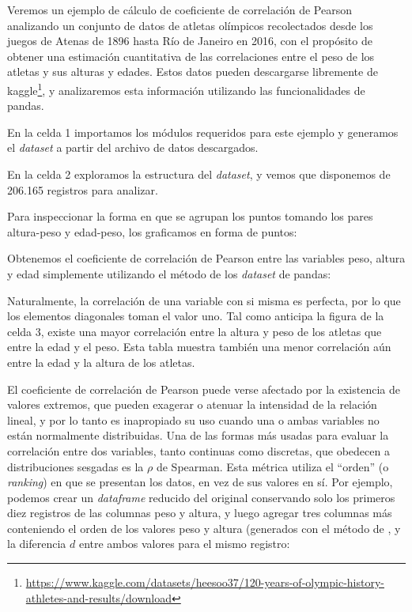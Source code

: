 Veremos un ejemplo de cálculo de coeficiente de correlación de Pearson analizando un conjunto de datos de atletas olímpicos recolectados desde los juegos de Atenas de 1896 hasta Río de Janeiro en 2016, con el propósito de obtener una estimación cuantitativa de las correlaciones entre el peso de los atletas y sus alturas y edades. Estos datos pueden descargarse libremente de kaggle\footnote{\url{https://www.kaggle.com/datasets/heesoo37/120-years-of-olympic-history-athletes-and-results/download}}, y analizaremos esta información utilizando las funcionalidades de pandas.

En la celda 1 importamos los módulos requeridos para este ejemplo y generamos el \textit{dataset} a partir del archivo de datos descargados.



En la celda 2 exploramos la estructura del \textit{dataset}, y vemos que disponemos de 206.165 registros para analizar.


Para inspeccionar la forma en que se agrupan los puntos tomando los pares altura-peso y edad-peso, los graficamos en forma de puntos:


Obtenemos el coeficiente de correlación de Pearson entre las variables peso, altura y edad simplemente utilizando el método  de los \textit{dataset} de pandas:


Naturalmente, la correlación de una variable con si misma es perfecta, por lo que los elementos diagonales toman el valor uno. Tal como anticipa la figura de la celda 3, existe una mayor correlación entre la altura y peso de los atletas que entre la edad y el peso. Esta tabla muestra también una menor correlación aún entre la edad y la altura de los atletas.

El coeficiente de correlación de Pearson puede verse afectado por la existencia de valores extremos, que pueden exagerar o atenuar la intensidad de la relación lineal, y por lo tanto es inapropiado su uso cuando una o ambas variables no están normalmente distribuidas. Una de las formas más usadas para evaluar la correlación entre dos variables, tanto continuas como discretas, que obedecen a distribuciones sesgadas es la $\rho$ de Spearman. Esta métrica utiliza el ``orden'' (o \textit{ranking}) en que se presentan los datos, en vez de sus valores en sí. Por ejemplo, podemos crear un \textit{dataframe} reducido del original conservando solo los primeros diez registros de las columnas peso y altura, y luego agregar tres columnas más conteniendo el orden de los valores peso y altura (generados con el método  de , y la diferencia $d$ entre ambos valores para el mismo registro:

